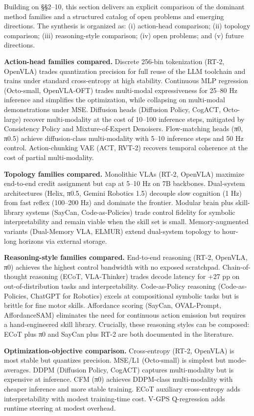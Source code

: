 \documentclass{article}
\begin{document}
Building on §§2--10, this section delivers an explicit comparison of the dominant method families and a structured catalog of open problems and emerging directions. The synthesis is organized as: (i) action-head comparison; (ii) topology comparison; (iii) reasoning-style comparison; (iv) open problems; and (v) future directions.

\textbf{Action-head families compared.} Discrete 256-bin tokenization (RT-2, OpenVLA) trades quantization precision for full reuse of the LLM toolchain and trains under standard cross-entropy at high stability. Continuous MLP regression (Octo-small, OpenVLA-OFT) trades multi-modal expressiveness for 25--80 Hz inference and simplifies the optimization, while collapsing on multi-modal demonstrations under MSE. Diffusion heads (Diffusion Policy, CogACT, Octo-large) recover multi-modality at the cost of 10--100 inference steps, mitigated by Consistency Policy and Mixture-of-Expert Denoisers. Flow-matching heads (π0, π0.5) achieve diffusion-class multi-modality with 5--10 inference steps and 50 Hz control. Action-chunking VAE (ACT, RVT-2) recovers temporal coherence at the cost of partial multi-modality.

\textbf{Topology families compared.} Monolithic VLAs (RT-2, OpenVLA) maximize end-to-end credit assignment but cap at 5--10 Hz on 7B backbones. Dual-system architectures (Helix, π0.5, Gemini Robotics 1.5) decouple slow cognition (1 Hz) from fast reflex (100--200 Hz) and dominate the frontier. Modular brain plus skill-library systems (SayCan, Code-as-Policies) trade control fidelity for symbolic interpretability and remain viable when the skill set is small. Memory-augmented variants (Dual-Memory VLA, ELMUR) extend dual-system topology to hour-long horizons via external storage.

\textbf{Reasoning-style families compared.} End-to-end reasoning (RT-2, OpenVLA, π0) achieves the highest control bandwidth with no exposed scratchpad. Chain-of-thought reasoning (ECoT, VLA-Thinker) trades decode latency for +27 pp on out-of-distribution tasks and interpretability. Code-as-Policy reasoning (Code-as-Policies, ChatGPT for Robotics) excels at compositional symbolic tasks but is brittle for fine motor skills. Affordance scoring (SayCan, OVAL-Prompt, AffordanceSAM) eliminates the need for continuous action emission but requires a hand-engineered skill library. Crucially, these reasoning styles can be composed: ECoT plus π0 and SayCan plus RT-2 are both documented in the literature.

\textbf{Optimization-objective comparison.} Cross-entropy (RT-2, OpenVLA) is most stable but quantizes precision. MSE/L1 (Octo-small) is simplest but mode-averages. DDPM (Diffusion Policy, CogACT) captures multi-modality but is expensive at inference. CFM (π0) achieves DDPM-class multi-modality with cheaper inference and more stable training. ECoT auxiliary cross-entropy adds interpretability with modest training-time cost. V-GPS Q-regression adds runtime steering at modest overhead.
\end{document}
